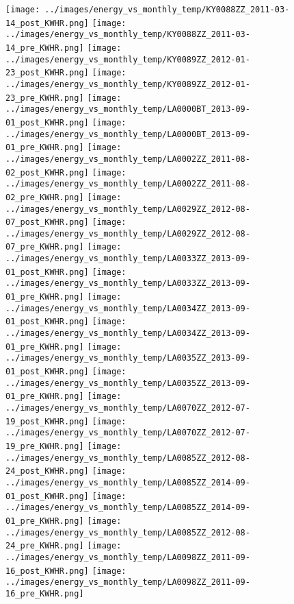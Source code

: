 \clearpage
\begin{figure}
\centering
\texttt{[image: ../images/energy\_vs\_monthly\_temp/KY0088ZZ\_2011-03-14\_post\_KWHR.png]}
\texttt{[image: ../images/energy\_vs\_monthly\_temp/KY0088ZZ\_2011-03-14\_pre\_KWHR.png]}
\texttt{[image: ../images/energy\_vs\_monthly\_temp/KY0089ZZ\_2012-01-23\_post\_KWHR.png]}
\texttt{[image: ../images/energy\_vs\_monthly\_temp/KY0089ZZ\_2012-01-23\_pre\_KWHR.png]}
\texttt{[image: ../images/energy\_vs\_monthly\_temp/LA0000BT\_2013-09-01\_post\_KWHR.png]}
\texttt{[image: ../images/energy\_vs\_monthly\_temp/LA0000BT\_2013-09-01\_pre\_KWHR.png]}
\texttt{[image: ../images/energy\_vs\_monthly\_temp/LA0002ZZ\_2011-08-02\_post\_KWHR.png]}
\texttt{[image: ../images/energy\_vs\_monthly\_temp/LA0002ZZ\_2011-08-02\_pre\_KWHR.png]}
\texttt{[image: ../images/energy\_vs\_monthly\_temp/LA0029ZZ\_2012-08-07\_post\_KWHR.png]}
\texttt{[image: ../images/energy\_vs\_monthly\_temp/LA0029ZZ\_2012-08-07\_pre\_KWHR.png]}
\texttt{[image: ../images/energy\_vs\_monthly\_temp/LA0033ZZ\_2013-09-01\_post\_KWHR.png]}
\texttt{[image: ../images/energy\_vs\_monthly\_temp/LA0033ZZ\_2013-09-01\_pre\_KWHR.png]}
\texttt{[image: ../images/energy\_vs\_monthly\_temp/LA0034ZZ\_2013-09-01\_post\_KWHR.png]}
\texttt{[image: ../images/energy\_vs\_monthly\_temp/LA0034ZZ\_2013-09-01\_pre\_KWHR.png]}
\texttt{[image: ../images/energy\_vs\_monthly\_temp/LA0035ZZ\_2013-09-01\_post\_KWHR.png]}
\texttt{[image: ../images/energy\_vs\_monthly\_temp/LA0035ZZ\_2013-09-01\_pre\_KWHR.png]}
\texttt{[image: ../images/energy\_vs\_monthly\_temp/LA0070ZZ\_2012-07-19\_post\_KWHR.png]}
\texttt{[image: ../images/energy\_vs\_monthly\_temp/LA0070ZZ\_2012-07-19\_pre\_KWHR.png]}
\texttt{[image: ../images/energy\_vs\_monthly\_temp/LA0085ZZ\_2012-08-24\_post\_KWHR.png]}
\texttt{[image: ../images/energy\_vs\_monthly\_temp/LA0085ZZ\_2014-09-01\_post\_KWHR.png]}
\texttt{[image: ../images/energy\_vs\_monthly\_temp/LA0085ZZ\_2014-09-01\_pre\_KWHR.png]}
\texttt{[image: ../images/energy\_vs\_monthly\_temp/LA0085ZZ\_2012-08-24\_pre\_KWHR.png]}
\texttt{[image: ../images/energy\_vs\_monthly\_temp/LA0098ZZ\_2011-09-16\_post\_KWHR.png]}
\texttt{[image: ../images/energy\_vs\_monthly\_temp/LA0098ZZ\_2011-09-16\_pre\_KWHR.png]}
\end{figure}
